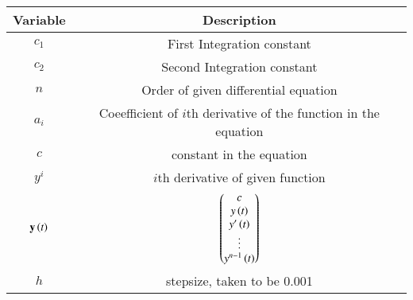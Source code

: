 \begin{tabular}[12pt]{ |c| c|}
    \hline
    \textbf{Variable} & \textbf{Description}\\ 
    \hline
    $c_1$ &First Integration constant\\
    \hline
    $c_2$ &Second Integration constant\\
    \hline
    $n$ & Order of given differential equation\\
    \hline
    $a_i$ & Coeefficient of $i$th derivative of the function in the equation\\
    \hline
    $c$ & constant in the equation\\
    \hline
    $y^i$ & $i$th derivative of given function\\
    \hline
    $\mathbf{y}\left(t\right)$ & $\begin{pmatrix}c \\ y\left(t\right) \\ y^\prime\left(t\right) \\ \vdots \\ y^{n-1}\left(t\right)\end{pmatrix}$\\
    \hline
    $h$ & stepsize, taken to be 0.001\\
    \hline
    \end{tabular}
